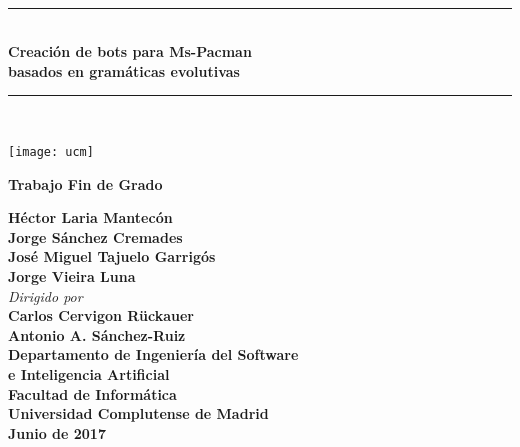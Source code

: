 \thispagestyle{empty}
\begin{titlepage}

\def\titulo{Creación de bots para Ms-Pacman\\ basados en gramáticas evolutivas}
\def\tipo{Trabajo Fin de Grado}
\def\autores{%
Héctor Laria Mantecón\\
Jorge Sánchez Cremades\\
José Miguel Tajuelo Garrigós\\
Jorge Vieira Luna
}
\def\profes{%
Carlos Cervigon Rückauer\\
Antonio A. S\'{a}nchez-Ruiz
}
\def\institucion{%
Departamento de Ingeniería del Software \\e Inteligencia Artificial\\[0.2em]
Facultad de Informática\\[0.2em]
Universidad Complutense de Madrid
}
\def\fecha{Junio de 2017}

\begin{huge}
\mbox{ }
\vfill

\newlength{\longTitulo}
\settowidth{\longTitulo}{%
asdfasdfasdfasdfasdfadfasdfasdfadfasdfasd}%
\begin{center}
\rule{\longTitulo}{.5mm}\\
\vskip 1cm
\textbf{\titulo}
\vskip 0.7cm
\rule{\longTitulo}{.5mm}\\
\end{center}
\end{huge}

\vfill

\begin{center}
\texttt{[image: ucm]}
\end{center}

\vfill

\begin{center}
  {\Large \textbf{\tipo}}
\end{center}

\vfill

\begin{large}

\begin{center}
\textbf{\autores}\\[0.3cm]

\textit{Dirigido por}\\[0.3cm]

\textbf{\profes}\\[0.3cm]

\textbf{\institucion}\\[1em]
\textbf{\fecha}

\end{center}

\end{large}

\vfill

\end{titlepage}
